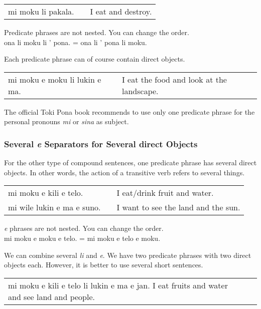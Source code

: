 \begin{supertabular}{p{5,5cm}|ll}
    mi moku li pakala. &  & I eat and destroy. \\
\end{supertabular}

Predicate phrases are not nested. You can change the order. \\
ona li moku li ' pona. = ona li ' pona li moku.

Each predicate phrase can of course contain direct objects.

\begin{supertabular}{p{5,5cm}|ll}
    mi moku e moku li lukin e ma. &  & I eat the food and look at the landscape. \\
\end{supertabular}

The official Toki Pona book recommends to use only one predicate phrase for the personal pronouns \textit{mi} or \textit{sina} as subject.
%

\label{'multiple_e'}
\subsubsection*{Several \textit{e} Separators for Several direct Objects}
%
%
For the other type of compound sentences, one predicate phrase has several direct objects.
In other words, the action of a transitive verb refers to several things.

\begin{supertabular}{p{5,5cm}|ll}
    mi moku e kili e telo.     &  & I eat/drink fruit and water.        \\
    mi wile lukin e ma e suno. &  & I want to see the land and the sun. \\
\end{supertabular}

\textit{e} phrases are not nested. You can change the order. \\
mi moku e moku e telo. = mi moku e telo e moku.

We can combine several \textit{li} and \textit{e}.
We have two predicate phrases with two direct objects each.
However, it is better to use several short sentences.

\begin{supertabular}{p{5,5cm}|ll}
    mi moku e kili e telo li lukin e ma e jan. I eat fruits and water and see land and people. \\
\end{supertabular}

